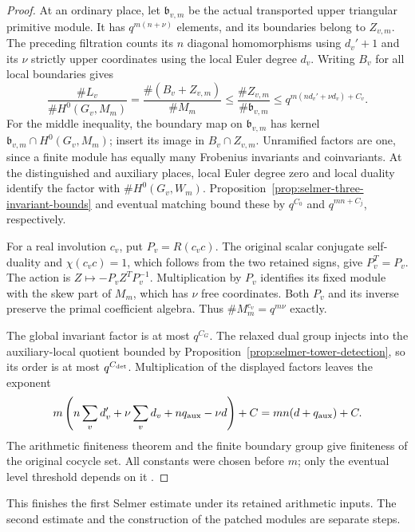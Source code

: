 \begin{proof}
At an ordinary place, let $\mathfrak b_{v,m}$ be the actual
transported upper triangular primitive module. It has
$q^{m(n+\nu)}$ elements, and its boundaries belong to $Z_{v,m}$.
The preceding filtration counts its $n$ diagonal homomorphisms
using $d_v'+1$ and its $\nu$ strictly upper coordinates using
the local Euler degree $d_v$.
Writing $B_v$ for all local boundaries gives
\[
 \frac{\#L_v}{\#H^0(G_v,M_m)}
 =\frac{\#(B_v+Z_{v,m})}{\#M_m}
 \leq\frac{\#Z_{v,m}}{\#\mathfrak b_{v,m}}
 \leq q^{m(nd_v'+\nu d_v)+C_v}.
\]
For the middle inequality, the boundary map on $\mathfrak b_{v,m}$
has kernel $\mathfrak b_{v,m}\cap H^0(G_v,M_m)$; insert its image
in $B_v\cap Z_{v,m}$. Unramified factors are one, since a finite
module has equally many Frobenius invariants and coinvariants.
At the distinguished and auxiliary places, local Euler degree zero
and local duality identify the factor with $\#H^0(G_v,W_m)$.
Proposition~\ref{prop:selmer-three-invariant-bounds} and eventual
matching bound these by $q^{C_0}$ and $q^{mn+C_j}$, respectively.

For a real involution $c_v$, put $P_v=R(c_vc)$. The original
scalar conjugate self-duality and $\chi(c_vc)=1$, which follows
from the two retained signs, give $P_v^T=P_v$. The action is
$Z\mapsto-P_vZ^TP_v^{-1}$. Multiplication by $P_v$ identifies
its fixed module with the skew part of $M_m$, which has $\nu$
free coordinates. Both $P_v$ and its inverse preserve the primal
coefficient algebra. Thus $\#M_m^{c_v}=q^{m\nu}$ exactly.

The global invariant factor is at most $q^{C_G}$. The relaxed dual
group injects into the auxiliary-local quotient bounded by
Proposition~\ref{prop:selmer-tower-detection}, so its order is at most
$q^{C_{\rm det}}$. Multiplication of the displayed factors leaves
the exponent
\[
 m\left(n\sum_vd_v'+\nu\sum_vd_v+nq_{\rm aux}-\nu d\right)+C
                         =mn(d+q_{\rm aux})+C.
\]
The arithmetic finiteness theorem and the finite boundary group give
finiteness of the original cocycle set. All constants were chosen
before $m$; only the eventual level threshold depends on it
\cite{alpo-first-global-selmer}.
\end{proof}

This finishes the first Selmer estimate under its retained arithmetic
inputs. The second estimate and the construction of the patched
modules are separate steps.
